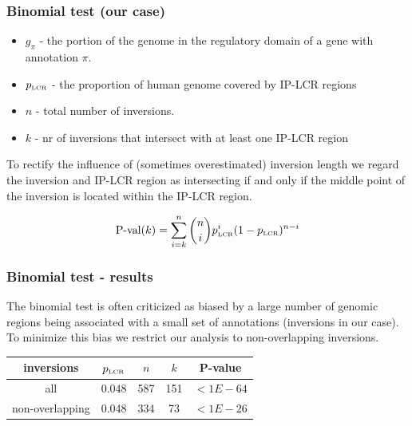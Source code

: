 
\begin{frame}\frametitle{Binomial test (our case)}  
\begin{itemize}  
 \item $g_{\pi}$ - the portion of the genome in the regulatory domain of a gene with annotation $\pi$. 
 \item $p_{\text{\tiny LCR}}$ - the proportion of human genome covered by IP-LCR regions
 \item $n$ - total number of inversions.
 \item $k$ - nr of inversions that intersect with at least one IP-LCR region

\end{itemize}
To  rectify the influence of (sometimes overestimated) inversion length we regard the inversion and IP-LCR region as intersecting if and only if the middle point 
of the inversion is located within the IP-LCR region.

$$
 \text{P-val}(k) = \sum_{i=k}^n {n \choose i} p_{\text{\tiny LCR}}^i (1-p_{\text{\tiny LCR}})^{n-i}
$$

\end{frame}


\begin{frame}\frametitle{Binomial test - results} 
The binomial test is often criticized as biased by a large number of genomic regions being associated with a small set of annotations (inversions in our case).
To minimize this  bias we  restrict our analysis to non-overlapping  inversions. 
\begin{table}[t!]
\begin{center}
\label{tab:binomial}
\begin{tabular}{c|c|c|c|c}
inversions  & $p_{\text{\tiny LCR}}$ & $n$ & $k$ & P-value \\\hline
all & 0.048 & 587 & 151 &  $<1E-64$\\\hline %
non-overlapping & 0.048 & 334 & 73 & $<1E-26$\\%
\end{tabular}
\end{center}
\end{table}
\end{frame}



